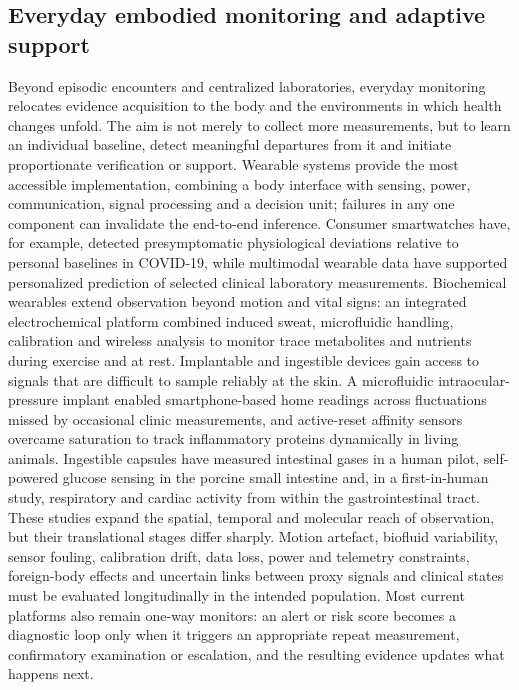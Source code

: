\documentclass[12pt,a4paper]{article}
\begin{document}
\subsection{Everyday embodied monitoring and adaptive support}
\label{subsec:everyday_monitoring}



Beyond episodic encounters and centralized laboratories, everyday monitoring relocates evidence acquisition to the body and the environments in which health changes unfold. The aim is not merely to collect more measurements, but to learn an individual baseline, detect meaningful departures from it and initiate proportionate verification or support. Wearable systems provide the most accessible implementation, combining a body interface with sensing, power, communication, signal processing and a decision unit; failures in any one component can invalidate the end-to-end inference. Consumer smartwatches have, for example, detected presymptomatic physiological deviations relative to personal baselines in COVID-19, while multimodal wearable data have supported personalized prediction of selected clinical laboratory measurements. Biochemical wearables extend observation beyond motion and vital signs: an integrated electrochemical platform combined induced sweat, microfluidic handling, calibration and wireless analysis to monitor trace metabolites and nutrients during exercise and at rest. Implantable and ingestible devices gain access to signals that are difficult to sample reliably at the skin. A microfluidic intraocular-pressure implant enabled smartphone-based home readings across fluctuations missed by occasional clinic measurements, and active-reset affinity sensors overcame saturation to track inflammatory proteins dynamically in living animals. Ingestible capsules have measured intestinal gases in a human pilot, self-powered glucose sensing in the porcine small intestine and, in a first-in-human study, respiratory and cardiac activity from within the gastrointestinal tract. These studies expand the spatial, temporal and molecular reach of observation, but their translational stages differ sharply. Motion artefact, biofluid variability, sensor fouling, calibration drift, data loss, power and telemetry constraints, foreign-body effects and uncertain links between proxy signals and clinical states must be evaluated longitudinally in the intended population. Most current platforms also remain one-way monitors: an alert or risk score becomes a diagnostic loop only when it triggers an appropriate repeat measurement, confirmatory examination or escalation, and the resulting evidence updates what happens next.
\end{document}
